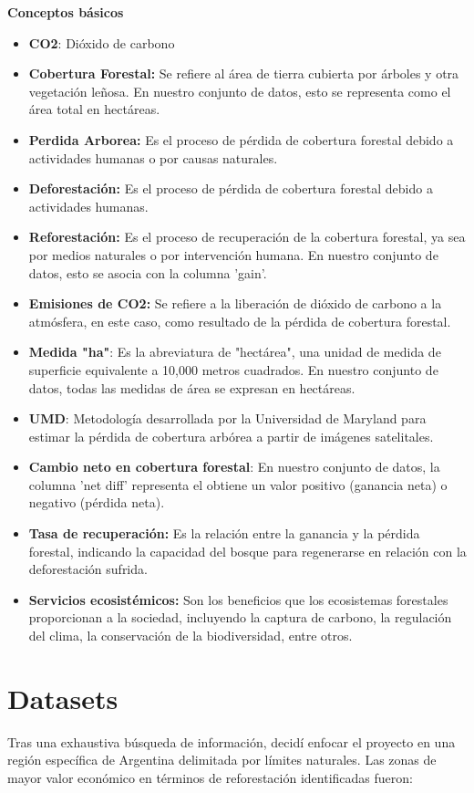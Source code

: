 \documentclass[11pt]{article}
\begin{document}
\textbf{Conceptos básicos}
\begin{itemize}
    \item \textbf{CO2}: Dióxido de carbono
    \item \textbf{Cobertura Forestal:} Se refiere al área de tierra cubierta por árboles y otra vegetación leñosa. En nuestro conjunto de datos, esto se representa como el área total en hectáreas.
    \item \textbf{Perdida Arborea:} Es el proceso de pérdida de cobertura forestal debido a actividades humanas o por causas naturales.
    \item \textbf{Deforestación: }Es el proceso de pérdida de cobertura forestal debido a actividades humanas.
    \item \textbf{Reforestación: }Es el proceso de recuperación de la cobertura forestal, ya sea por medios naturales o por intervención humana. En nuestro conjunto de datos, esto se asocia con la columna 'gain'.
    \item \textbf{Emisiones de CO2:} Se refiere a la liberación de dióxido de carbono a la atmósfera, en este caso, como resultado de la pérdida de cobertura forestal.
    \item \textbf{Medida "ha"}: Es la abreviatura de "hectárea", una unidad de medida de superficie equivalente a 10,000 metros cuadrados. En nuestro conjunto de datos, todas las medidas de área se expresan en hectáreas.
    \item \textbf{UMD}: Metodología desarrollada por la Universidad de Maryland para estimar la pérdida de cobertura arbórea a partir de imágenes satelitales.
    \item \textbf{Cambio neto en cobertura forestal}: En nuestro conjunto de datos, la columna 'net diff' representa el obtiene un valor positivo (ganancia neta) o negativo (pérdida neta).
    \item \textbf{Tasa de recuperación:} Es la relación entre la ganancia y la pérdida forestal, indicando la capacidad del bosque para regenerarse en relación con la deforestación sufrida.
    \item \textbf{Servicios ecosistémicos: }Son los beneficios que los ecosistemas forestales proporcionan a la sociedad, incluyendo la captura de carbono, la regulación del clima, la conservación de la biodiversidad, entre otros.
\end{itemize}

\section{Datasets}
Tras una exhaustiva búsqueda de información, decidí enfocar el proyecto en una región específica de Argentina delimitada por límites naturales. Las zonas de mayor valor económico en términos de reforestación identificadas fueron:
\end{document}
